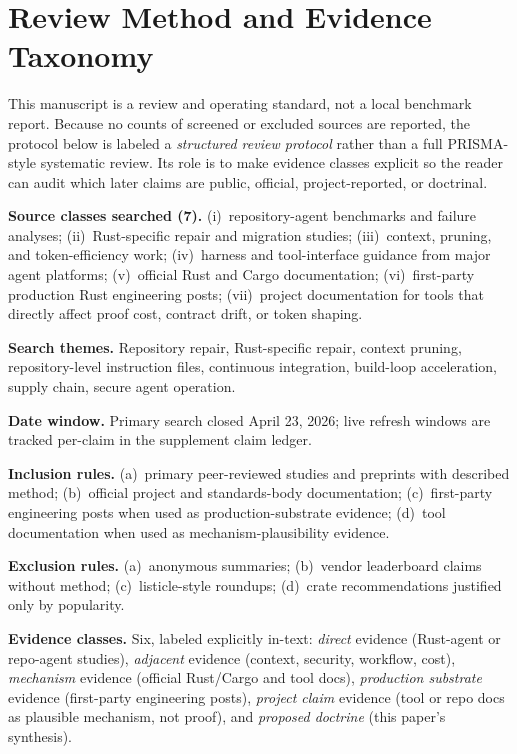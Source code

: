 \documentclass[conference]{IEEEtran}
\begin{document}
\section{Review Method and Evidence Taxonomy}
\label{sec:method}
This manuscript is a review and operating standard, not a local benchmark report. Because no counts of screened or excluded sources are reported, the protocol below is labeled a \emph{structured review protocol} rather than a full PRISMA-style systematic review. Its role is to make evidence classes explicit so the reader can audit which later claims are public, official, project-reported, or doctrinal.

\noindent\textbf{Source classes searched (7).} (i)~repository-agent benchmarks and failure analyses; (ii)~Rust-specific repair and migration studies; (iii)~context, pruning, and token-efficiency work; (iv)~harness and tool-interface guidance from major agent platforms; (v)~official Rust and Cargo documentation; (vi)~first-party production Rust engineering posts; (vii)~project documentation for tools that directly affect proof cost, contract drift, or token shaping.

\noindent\textbf{Search themes.} Repository repair, Rust-specific repair, context pruning, repository-level instruction files, continuous integration, build-loop acceleration, supply chain, secure agent operation.

\noindent\textbf{Date window.} Primary search closed April 23, 2026; live refresh windows are tracked per-claim in the supplement claim ledger.

\noindent\textbf{Inclusion rules.} (a)~primary peer-reviewed studies and preprints with described method; (b)~official project and standards-body documentation; (c)~first-party engineering posts when used as production-substrate evidence; (d)~tool documentation when used as mechanism-plausibility evidence.

\noindent\textbf{Exclusion rules.} (a)~anonymous summaries; (b)~vendor leaderboard claims without method; (c)~listicle-style roundups; (d)~crate recommendations justified only by popularity.

\noindent\textbf{Evidence classes.} Six, labeled explicitly in-text: \emph{direct} evidence (Rust-agent or repo-agent studies), \emph{adjacent} evidence (context, security, workflow, cost), \emph{mechanism} evidence (official Rust/Cargo and tool docs), \emph{production substrate} evidence (first-party engineering posts), \emph{project claim} evidence (tool or repo docs as plausible mechanism, not proof), and \emph{proposed doctrine} (this paper's synthesis).
\end{document}
